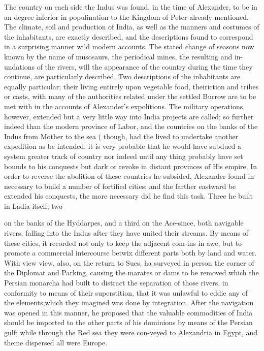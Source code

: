 The country on each side the Indus was found, in the time of Alexander, to be in an degree inferior in populination to the Kingdom of Peter already mentioned. The climate, soil and production of India, as well as the manners and costumes of the inhabitants, are exactly described, and the descriptions found to correspond in a surprising manner wild modern accounts. The stated change of seasons now known by the name of musosaurs, the periodical mines, the resulting and in-undations of the rivers, will the appearance of the country during the time they continue, are particularly described. Two descriptions of the inhabitants are equally particular; their living entirely upon vegetable food, theiriction and tribes or casts, with many of the authorities related under the settled Burrow are to be met with in the accounts of Alexander’s expolitions. The military operations, however, extended but a very little way into India projects are called; so further indeed than the modern province of Labor, and the countries on the banks of the Indus from Mother to the sea ( though, had the lived to undertake another expedition as be intended, it is very probable that he would have subdued a system greater track of country nor indeed until any thing probably have set bounds to his conquests but dark or revoke in distant provinces of His empire. In order to reverse the abolition of these countries he subsided, Alexander found in necessary to build a number of fortified cities; and the farther eastward be extended his conquests, the more necessary did he find this task. Three he built in Ladia itself; two\par\medskip
on the banks of the Hyddarpes, and a third on the Ace-since, both navigable rivers, falling into the Indus after they have united their streams. By means of these cities, it recorded not only to keep the adjacent com-ins in awe, but to promote a commercial intercourse betwix different parts both by land and water. With view view, also, on the return to Sues, ha surveyed in person the corner of the Diplomat and Parking, causing the marates or dams to be removed which the Persian monarcha had built to distract the separation of those rivers, in conformity to means of their superstition, that it was unlawful to eddie any of the elements,which they imagined was done by integration. After the navigation was opened in this manner, he proposed that the valuable commodities of India should be imported to the other parts of his dominions by means of the Persian gulf; while through the Red sea they were con-veyed to Alexandria in Egypt, and theme dispersed all were Europe.\par\medskip

